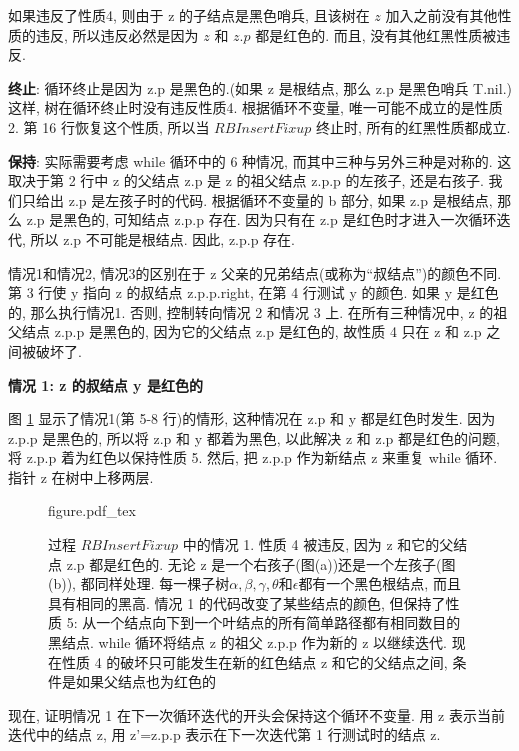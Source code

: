 \documentclass[oneside,10pt,fontset=none]{ctexbook}
\numberwithin{definition}{chapter}
\numberwithin{theorem}{chapter}
\numberwithin{lemma}{chapter}
\begin{document}
如果违反了性质4, 则由于 z 的子结点是黑色哨兵, 且该树在 $z$ 加入之前没有其他性质的违反, 所以违反必然是因为 $z$ 和 $z.p$ 都是红色的. 而且, 没有其他红黑性质被违反.

\textbf{终止}: 循环终止是因为 z.p 是黑色的.(如果 z 是根结点, 那么 z.p 是黑色哨兵 T.nil.) 这样, 树在循环终止时没有违反性质4. 根据循环不变量, 唯一可能不成立的是性质2. 第 16 行恢复这个性质, 所以当 $RBInsertFixup$ 终止时, 所有的红黑性质都成立.

\textbf{保持}: 实际需要考虑 while 循环中的 6 种情况, 而其中三种与另外三种是对称的. 这取决于第 2 行中 z 的父结点 z.p 是 z 的祖父结点 z.p.p 的左孩子, 还是右孩子. 我们只给出 z.p 是左孩子时的代码. 根据循环不变量的 b 部分, 如果 z.p 是根结点, 那么 z.p 是黑色的, 可知结点 z.p.p 存在. 因为只有在 z.p 是红色时才进入一次循环迭代, 所以 z.p 不可能是根结点. 因此, z.p.p 存在.

情况1和情况2, 情况3的区别在于 z 父亲的兄弟结点(或称为``叔结点'')的颜色不同. 第 3 行使 y 指向 z 的叔结点 z.p.p.right, 在第 4 行测试 y 的颜色. 如果 y 是红色的, 那么执行情况1. 否则, 控制转向情况 2 和情况 3 上. 在所有三种情况中, z 的祖父结点 z.p.p 是黑色的, 因为它的父结点 z.p 是红色的, 故性质 4 只在 z 和 z.p 之间被破坏了.

\textbf{情况 1: z 的叔结点 y 是红色的}

图 \ref{fig:红黑树插入过程修复的情形一} 显示了情况1(第 5-8 行)的情形, 这种情况在 z.p 和 y 都是红色时发生. 因为 z.p.p 是黑色的, 所以将 z.p 和 y 都着为黑色, 以此解决 z 和 z.p 都是红色的问题, 将 z.p.p 着为红色以保持性质 5. 然后, 把 z.p.p 作为新结点 z 来重复 while 循环. 指针 z 在树中上移两层.

\begin{figure}[htbp]
    \centering
    \def\svgwidth{\columnwidth}
    {figure.pdf_tex}
    \label{fig:红黑树插入过程修复的情形一}
    \caption{过程 $RBInsertFixup$ 中的情况 1. 性质 4 被违反, 因为 z 和它的父结点 z.p 都是红色的. 无论 z 是一个右孩子(图(a))还是一个左孩子(图(b)), 都同样处理. 每一棵子树$\alpha,\beta,\gamma,\theta\text{和}\epsilon$都有一个黑色根结点, 而且具有相同的黑高. 情况 1 的代码改变了某些结点的颜色, 但保持了性质 5: 从一个结点向下到一个叶结点的所有简单路径都有相同数目的黑结点. while 循环将结点 z 的祖父 z.p.p 作为新的 z 以继续迭代. 现在性质 4 的破坏只可能发生在新的红色结点 z 和它的父结点之间, 条件是如果父结点也为红色的}
\end{figure}

现在, 证明情况 1 在下一次循环迭代的开头会保持这个循环不变量. 用 z 表示当前迭代中的结点 z, 用 z'=z.p.p 表示在下一次迭代第 1 行测试时的结点 z.
\end{document}
